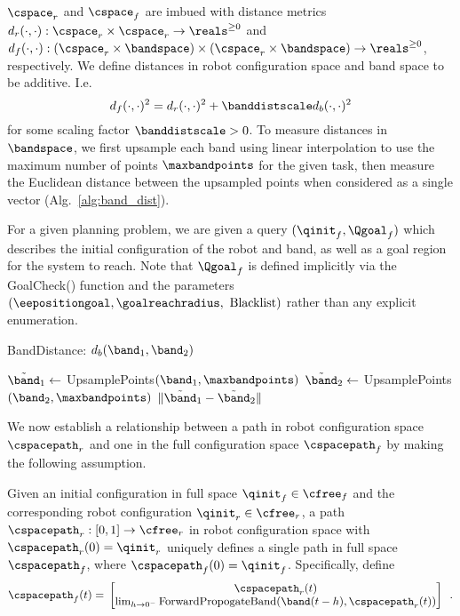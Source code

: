 $\cspace_r$ and $\cspace_f$ are imbued with distance metrics $d_r(\cdot,\cdot) : \cspace_r \times \cspace_r \rightarrow \reals^{\geq 0}$ and $d_f(\cdot,\cdot) : (\cspace_r \times \bandspace) \times (\cspace_r \times \bandspace) \rightarrow \reals^{\geq 0}$, respectively. We define distances in robot configuration space and band space to be additive. I.e.
\begin{equation}
    d_f(\cdot, \cdot)^2 = d_r(\cdot, \cdot)^2 + \banddistscale d_b(\cdot, \cdot)^2
    \label{eqn:dist_metric}
\end{equation}
for some scaling factor $\banddistscale > 0$. To measure distances in $\bandspace$, we first upsample each band using linear interpolation to use the maximum number of points $\maxbandpoints$ for the given task, then measure the Euclidean distance between the upsampled points when considered as a single vector (Alg.~\ref{alg:band_dist}).

For a given planning problem, we are given a query $( \qinit_f, \Qgoal_f )$ which describes the initial configuration of the robot and band, as well as a goal region for the system to reach.  Note that $\Qgoal_f$ is defined implicitly via the GoalCheck() function and the parameters $(\eepositiongoal, \goalreachradius,\textrm{ Blacklist})$ rather than any explicit enumeration.


\begin{algorithm}[t]
\caption{BandDistance: $d_b(\band_1, \band_2)$}
\begin{algorithmic}[1]
    \State $\tilde \band_1 \gets$ UpsamplePoints$(\band_1, \maxbandpoints)$
    \State $\tilde \band_2 \gets$ UpsamplePoints$(\band_2, \maxbandpoints)$
    \State \Return $\| \tilde \band_1 - \tilde \band_2\|$
\end{algorithmic}
\label{alg:band_dist}
\end{algorithm}


We now establish a relationship between a path in robot configuration space $\cspacepath_r$ and one in the full configuration space $\cspacepath_f$ by making the following assumption.


\begin{assumption}
\label{ass:deterministic}
    Given an initial configuration in full space $\qinit_f \in \cfree_f$ and the corresponding robot configuration $\qinit_r \in \cfree_r$, a path $\cspacepath_r : [0, 1] \rightarrow \cfree_r$ in robot configuration space with $\cspacepath_r(0) = \qinit_r$ uniquely defines a single path in full space $\cspacepath_f$, where $\cspacepath_f(0) = \qinit_f$.  Specifically, define
    \begin{equation}
        \cspacepath_f(t) =\\ \begin{bmatrix} \cspacepath_r(t) \\ \lim_{h \rightarrow 0^-} \textup{ForwardPropogateBand}(\band(t-h), \cspacepath_r(t)) \end{bmatrix} \enspace .
        \label{eqn:deterministic}
    \end{equation}
\end{assumption}


